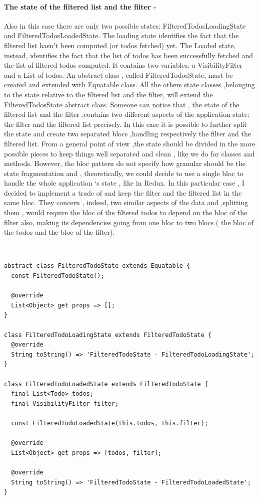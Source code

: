 \paragraph{The state of the filtered list and the filter - }
\label{subpar:todo_app_bloc_core_state}
Also in this case there are only two possible states: FilteredTodosLoadingState and FilteredTodosLoadedState. The loading state identifies the fact that the filtered list hasn’t been computed (or todos fetched) yet. The Loaded state, instead,  identifies the fact that the list of todos has been successfully fetched and the list of filtered todos computed. It contains two variables: a VisibilityFilter and a List of todos. An abstract class , called FilteredTodosState, must be created and extended with Equatable class. All the others state classes ,belonging to the state relative to the filtered list and the filter, will extend the FilteredTodosState abstract class. Someone can notice that , the state of the filtered list and the filter ,contains two different aspects of the application state: the filter and the filtered list precisely. In this case it is possible to further split the state and create two separated blocs ,handling respectively the filter and the filtered list. From a general point of view ,the state should be divided in the more possible pieces to keep things well separated and clean , like we do for classes and methods. However, the bloc pattern do not specify how granular should be the state fragmentation and , theoretically, we could decide to use a single bloc to handle the whole application ‘s state , like in Redux. In this particular case , I decided to implement a trade of and keep the filter and the filtered list in the same bloc. They concern , indeed, two similar aspects of the data and ,splitting them , would require the bloc of the filtered todos to depend on the bloc of the filter also, making its dependencies  going from one bloc to two blocs ( the bloc of the todos and the bloc of the filter).
\begin{code}
\mbox{}\\
 \mbox{}
\label{code:2.14}
\begin{verbatim}
abstract class FilteredTodoState extends Equatable {
  const FilteredTodoState();

  @override
  List<Object> get props => [];
}

class FilteredTodoLoadingState extends FilteredTodoState {
  @override
  String toString() => 'FilteredTodoState - FilteredTodoLoadingState';
}

class FilteredTodoLoadedState extends FilteredTodoState {
  final List<Todo> todos;
  final VisibilityFilter filter;

  const FilteredTodoLoadedState(this.todos, this.filter);

  @override
  List<Object> get props => [todos, filter];

  @override
  String toString() => 'FilteredTodoState - FilteredTodoLoadedState';
}
\end{verbatim}
\mbox{}
\end{code}


